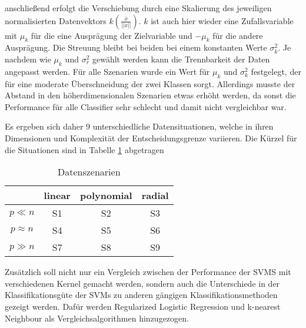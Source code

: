 \documentclass[
]{article}
\begin{document}
anschließend erfolgt die Verschiebung durch eine Skalierung des
jeweiligen normalisierten Datenvektors
\(k\left(\frac{\overline{x}}{||x||}\right)\). \(k\) ist auch hier wieder
eine Zufallsvariable mit \(\mu_k\) für die eine Ausprägung der
Zielvariable und \(-\mu_k\) für die andere Ausprägung. Die Streuung
bleibt bei beiden bei einem konstanten Werte \(\sigma^2_k\). Je nachdem
wie \(\mu_k\) und \(\sigma^2_r\) gewählt werden kann die Trennbarkeit
der Daten angepasst werden. Für alle Szenarien wurde ein Wert für
\(\mu_k\) und \(\sigma^2_k\) festgelegt, der für eine moderate
Überschneidung der zwei Klassen sorgt. Allerdings musste der Abstand in
den höherdimensionalen Szenarien etwas erhöht werden, da sonst die
Performance für alle Classifier sehr schlecht und damit nicht
vergleichbar war.

Es ergeben sich daher 9 unterschiedliche Datensituationen, welche in
ihren Dimensionen und Komplexität der Entscheidungsgrenze variieren. Die
Kürzel für die Situationen sind in Tabelle \ref{tab:datensituationen}
abgetragen

\begin{table}[H]
\begin{center}
\begin{tabular}{ |c|c|c|c| }
 \hline
  & linear & polynomial & radial \\
 \hline
 $p \ll n$ & S1 & S2 & S3 \\
 \hline
 $p \approx n$ & S4 & S5 & S6 \\
 \hline
 $p \gg n$ & S7 & S8 & S9 \\
 \hline
\end{tabular}
\end{center}
\caption{Datenszenarien}
\label{tab:datensituationen}
\end{table}

Zusätzlich soll nicht nur ein Vergleich zwischen der Performance der
SVMS mit verschiedenen Kernel gemacht werden, sondern auch die
Unterschiede in der Klassifikationsgüte der SVMs zu anderen gängigen
Klassifikationsmethoden gezeigt werden. Dafür werden Regularized
Logistic Regression und k-nearest Neighbour als Vergleichsalgorithmen
hinzugezogen.

\printbibliography
\end{document}
